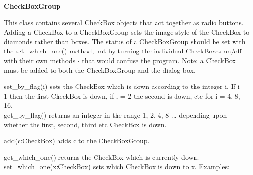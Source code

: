{\sffamily\bfseries
{}CheckBoxGroup}

This class contains several CheckBox objects that act together as
{\textquotedbl}radio buttons{\textquotedbl}. Adding a CheckBox to a
CheckBoxGroup sets the image style of the CheckBox to diamonds rather
than boxes. The status of a CheckBoxGroup should be set with the
set\_which\_one() method, not by turning the individual CheckBoxes
on/off with their own methods - that would confuse the program. Note: a
CheckBox must be added to both the CheckBoxGroup and the dialog box.

set\_by\_flag(i) sets the CheckBox which is down according to the
integer i. If i = 1 then the first CheckBox is down, if i = 2 the
second is down, etc for i = 4, 8, 16.\\
get\_by\_flag() returns an integer in the range 1, 2, 4, 8 ... depending
upon whether the first, second, third etc CheckBox is down.

add(c:CheckBox) adds c to the CheckBoxGroup.

get\_which\_one() returns the CheckBox which is currently down.\\
set\_which\_one(x:CheckBox) sets which CheckBox is down to x. Examples:


